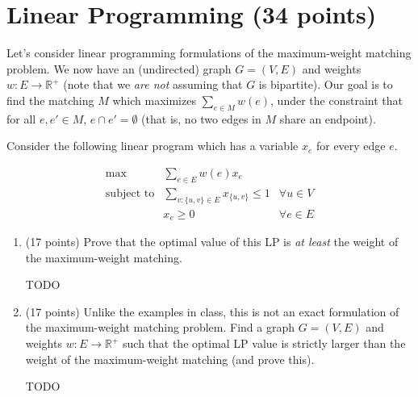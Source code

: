 \documentclass[11pt]{article}
\begin{document}
\section{Linear Programming (34 points)}

Let's consider linear programming formulations of the maximum-weight matching problem. We now have an (undirected) graph $G = (V, E)$ 
and weights $w : E \rightarrow \mathbb{R}^+$ (note that we \emph{are not} assuming that $G$ is bipartite). Our goal is to find the matching $M$ which 
maximizes $\sum_{e \in M} w(e)$, under the constraint that for all $e, e' \in M$, $e \cap e' = \emptyset$ (that is, no two edges in $M$ share an endpoint).  

Consider the following linear program which has a variable $x_e$ for every edge $e$.

\begin{align*}
\max &\sum_{e \in E} w(e) x_e \\
\text{subject to} & \sum_{v : \{u,v\} \in E} x_{\{u,v\}} \leq 1  & \forall u \in V \\
& x_e \geq 0 & \forall e \in E
\end{align*}


\begin{enumerate}
\item (17 points) Prove that the optimal value of this LP is \emph{at least} the weight of the maximum-weight matching.

\bigbreak

TODO

\bigbreak

\item (17 points) Unlike the examples in class, this is not an exact formulation of the maximum-weight matching problem. 
Find a graph $G = (V,E)$ and weights $w : E \rightarrow \mathbb{R}^+$ such that the optimal LP value is strictly larger than the weight of 
the maximum-weight matching (and prove this).

\bigbreak

TODO

\end{enumerate}
\end{document}
